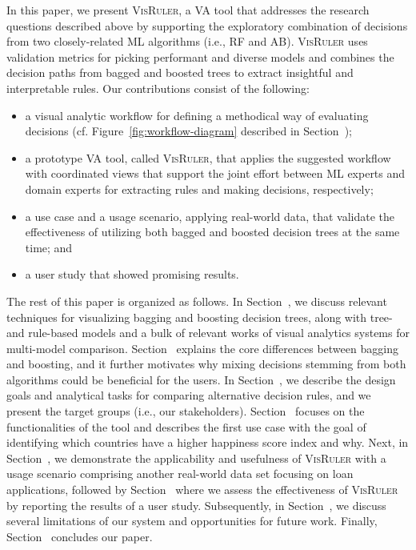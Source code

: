 In this paper, we present \textsc{VisRuler},
a VA tool that addresses the research questions described above by supporting the exploratory combination of decisions from two closely-related ML algorithms (i.e., RF and AB). \textsc{VisRuler} uses validation metrics for picking performant and diverse models and combines the decision paths from bagged and boosted trees to extract insightful and interpretable rules.
%
Our contributions consist of the following:

\begin{itemize}
\item a visual analytic workflow for defining a methodical way of evaluating decisions (cf. Figure~\ref{fig:workflow-diagram} described in Section~);
\item a prototype VA tool, called \textsc{VisRuler}, that applies the suggested workflow with coordinated views that support the joint effort between ML experts and domain experts for extracting rules and making decisions, respectively;
\item a use case and a usage scenario, applying real-world data, that validate the effectiveness of utilizing both bagged and boosted decision trees at the same time; and
\item a user study that showed promising results.
\end{itemize}      

\noindent The rest of this paper is organized as follows. In Section~, we discuss relevant techniques for visualizing bagging and boosting decision trees, along with tree- and rule-based models and a bulk of relevant works of visual analytics systems for multi-model comparison. Section~ explains the core differences between bagging and boosting, and it further motivates why mixing decisions stemming from both algorithms could be beneficial for the users. In Section~, we describe the design goals and analytical tasks for comparing alternative decision rules, and we present the target groups (i.e., our stakeholders). Section~ focuses on the functionalities of the tool and describes the first use case with the goal of identifying which countries have a higher happiness score index and why. Next, in Section~, we demonstrate the applicability and usefulness of \textsc{VisRuler} with a usage scenario comprising another real-world data set focusing on loan applications, followed by Section~ where we assess the effectiveness of \textsc{VisRuler} by reporting the results of a user study. Subsequently, in Section~, we discuss several limitations of our system and opportunities for future work. Finally, Section~ concludes our paper.